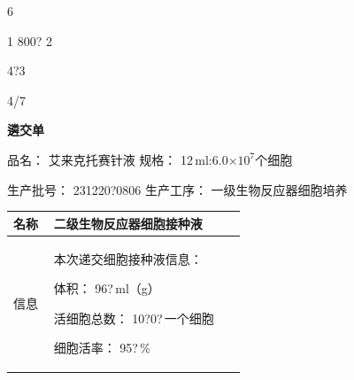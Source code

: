 \documentclass[UTF8,10pt,a4paper,fontset=fandol]{ctexart}
\newcommand{\fieldvalue}[1]{#1}
\newcommand{\handwritten}[1]{#1}
\begin{document}
\vfill

\handwritten{6}

\newpage

\begin{center}
\end{center}

\vfill

\handwritten{1 800? 2}

\handwritten{4?3}

\handwritten{4/7}

\newpage

\begin{center}
\textbf{遴交单}
\end{center}

\noindent
品名：%
\fieldvalue{艾来克托赛针液}
\hfill
规格：%
\fieldvalue{12\,ml:6.0$\times10^{7}$个细胞}

\noindent
生产批号：%
\fieldvalue{\handwritten{231220?0806}}
\hfill
生产工序：%
\fieldvalue{一级生物反应器细胞培养}

\vspace{0.5em}

\noindent
\begin{tabular}{|p{0.16\linewidth}|p{0.76\linewidth}|}
\hline
名称 &
\fieldvalue{二级生物反应器细胞接种液}
\\ \hline
信息 &
本次递交细胞接种液信息：

体积：%
\fieldvalue{\handwritten{96?}}\,ml（g）

活细胞总数：%
\fieldvalue{\handwritten{10?0?}}\,一个细胞

细胞活率：%
\fieldvalue{\handwritten{95?}}\,\%
\\ \hline
\end{tabular}
\end{document}
